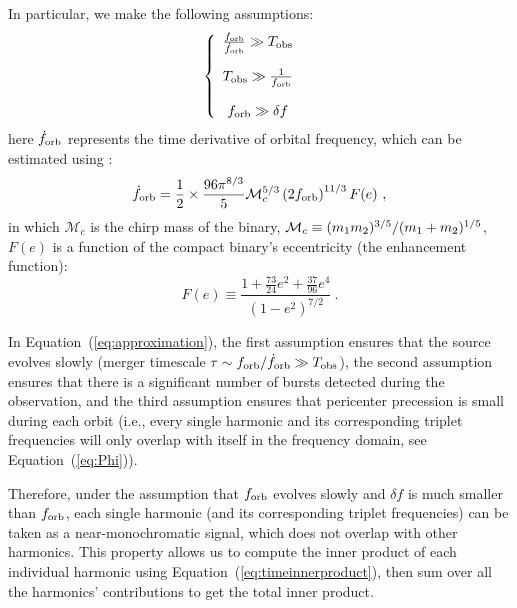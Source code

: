 \documentclass[%
 reprint,
 amsmath,amssymb,
 aps,
]{revtex4-2}
\begin{document}
In particular, we make the following assumptions:
\begin{align}
\left\{
\begin{array}{cc}
     \frac{f_{\rm orb}}{\dot{f}_{\rm orb}}\gg T_{\rm obs} &\\[3ex]
     T_{\rm obs}\gg \frac{1}{f_{\rm orb}} &\\[3ex]
     f_{\rm orb}\gg \delta f &
\end{array}
\right.
\label{eq:approximation}
\end{align}
here $\dot f_{\rm orb}$ represents the time derivative of orbital frequency, which can be estimated using \citep{Peters64,Xuan+21}:
\begin{equation}
	\dot{f}_{\rm orb}=\frac{1}{2}\times
    \frac{96 \pi^{8/3}}{5}\mathcal{M}_{c}^{5/3}\left(2 f_{\rm orb}\right)^{11/3}F(e) \ ,
    \label{eq:chirp mass}
\end{equation}
in which $\mathcal{M}_{c}$ is the chirp mass of the binary, ${\cal
M}_{c}\equiv (m_1m_2)^{3/5}/(m_1+m_2)^{1/5}$, $F(e)$ is a function of the compact binary's eccentricity (the enhancement function)\citep{peters63}:
\begin{equation}\label{eq:Fe}
F(e)\equiv\frac{1+\frac{73}{24}e^{2}+\frac{37}{96}e^{4}}{(1-e^{2})^{7/2}} \ .
\end{equation}

In Equation~(\ref{eq:approximation}), the first assumption ensures that the source evolves slowly (merger timescale $\tau\sim f_{\rm orb}/\dot{f}_{\rm orb}\gg T_{\rm obs}$), the second assumption ensures that there is a significant number of bursts detected during the observation, and the third assumption ensures that pericenter precession is small during each orbit (i.e., every single harmonic and its corresponding triplet frequencies will only overlap with itself in the frequency domain, see Equation~(\ref{eq:Phi})).
 
Therefore, under the assumption that $f_{\rm orb}$ evolves slowly and $\delta f$ is much smaller than $f_{\rm orb}$, each single harmonic (and its corresponding triplet frequencies) can be taken as a near-monochromatic signal, which does not overlap with other harmonics. This property allows us to compute the inner product of each individual harmonic using Equation~(\ref{eq:timeinnerproduct}), then sum over all the harmonics' contributions to get the total inner product.
\end{document}
